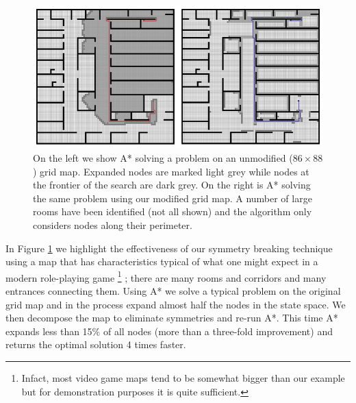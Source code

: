 \begin{figure}[t]
\centering
	    \includegraphics[width=0.95\columnwidth, trim = 10mm 10mm 10mm 0mm]{diagrams/oha_contrast.png}
		\caption{On the left we show A* solving a problem on an unmodified ($86\times88$) grid map. 
		Expanded nodes are marked light grey while nodes at the frontier of the search are dark grey.
		On the right is A* solving the same problem using our modified grid map. A number of large rooms have been identified (not
		all shown) and the algorithm only considers nodes along their perimeter.}
	\label{fig-contrast}
\end{figure}

In Figure \ref{fig-contrast} we highlight the effectiveness of our symmetry breaking technique using
a map that has characteristics typical of what one might expect in a modern role-playing game \footnote{
Infact, most video game maps tend to be somewhat bigger than our example but for demonstration 
purposes it is quite sufficient.}
; there are many rooms and corridors and many entrances connecting them.
Using A* we solve a typical problem on the original grid map and in the process expand almost half the nodes
in the state space.
We then decompose the map to eliminate symmetries and re-run A*.
This time A* expands less than 15\% of all nodes (more than a three-fold improvement) and returns the 
optimal solution 4 times faster.

